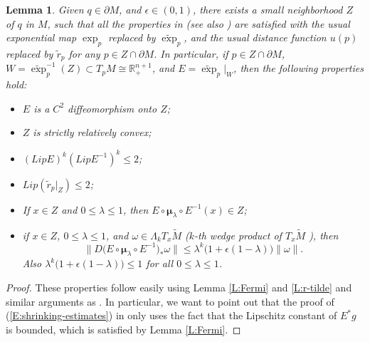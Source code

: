 \documentclass[10pt]{amsart}
\newtheorem{lemma}[theorem]{Lemma}
\theoremstyle{definition}
\theoremstyle{remark}
\numberwithin{equation}{section}
\newcommand{\R}{\mathbb{R}}
\newcommand{\la}{\lambda}
\newcommand{\La}{\Lambda}
\newcommand{\ep}{\epsilon}
\newcommand{\om}{\omega}
\newcommand{\bmu}{\boldsymbol \mu}
\newcommand{\tM}{\widetilde{M}}
\newcommand{\tE}{\widetilde{\exp}}
\newcommand{\tir}{\widetilde{r}}
\begin{document}
\begin{lemma}
\label{L:good-nbd}
Given $q\in \partial M$, and $\ep\in (0, 1)$, there exists a small neighborhood $Z$ of $q$ in $M$, such that all the properties in \cite[3.4(4)]{Pitts} (see also \cite[\S 7.2(a)$\cdots$(f)]{Zhou17}) are satisfied with the usual exponential map $\exp_p$ replaced by $\tE_p$, and the usual distance function $u(p)$ replaced by $\tir_p$ for any $p\in Z \cap \partial M$. In particular, if $p\in Z\cap\partial M$, $W=\tE_p^{-1}(Z)\subset T_p M\cong\R_+^{n+1}$, and $E=\tE_p|_W$, then the following properties hold:
\begin{itemize}
\item[$(a)$] $E$ is a $C^2$ diffeomorphism onto $Z$;

\item[$(b)$] $Z$ is strictly relatively convex;

\item[$(c)$] $(Lip E)^k(Lip E^{-1})^k\leq 2$;

\item[$(d)$] $Lip(\tir_p|_Z)\leq 2$;

\item[$(e)$] If $x\in Z$ and $0\leq \la\leq 1$, then $E\circ \bmu_\la \circ E^{-1}(x)\in Z$;

\item[$(f)$] if $x\in Z$, $0\leq \la\leq 1$, and $\om\in \La_k T_x \tM$ ($k$-th wedge product of $T_x\tM$ \cite[\S 25]{Simon}), then
\begin{equation}
\label{E:shrinking-estimates}
\|D\big( E\circ \bmu_\la \circ E^{-1}\big)_* \om\|\leq \la^k\big(1+\ep(1-\la)\big)\|\om\|.
\end{equation}
Also $\la^k\big(1+\ep(1-\la)\big)\leq 1$ for all $0\leq \la\leq 1$.
\end{itemize}
\end{lemma}

\begin{proof}
These properties follow easily using Lemma \ref{L:Fermi} and \ref{L:r-tilde} and similar arguments as \cite[3.4(4)]{Pitts}. In particular, we want to point out that the proof of (\ref{E:shrinking-estimates}) in \cite[3.4(4)]{Pitts} only uses the fact that the Lipschitz constant of $E^*g$ is bounded, which is satisfied by Lemma \ref{L:Fermi}.
\end{proof}
\end{document}
